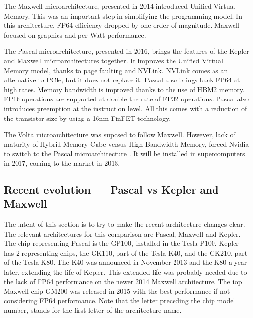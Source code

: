 The Maxwell microarchitecture, presented in 2014 introduced Unified Virtual Memory.
This was an important step in simplifying the programming model.
In this architecture, FP64 efficiency dropped by one order of magnitude.
Maxwell focused on graphics and per Watt performance.

The Pascal microarchitecture, presented in 2016, brings the features of the Kepler and Maxwell microarchitectures together.
It improves the Unified Virtual Memory model, thanks to page faulting and NVLink.
NVLink comes as an alternative to PCIe, but it does not replace it.
Pascal also brings back FP64 at high rates.
Memory bandwidth is improved thanks to the use of HBM2 memory.
FP16 operations are supported at double the rate of FP32 operations.
Pascal also introduces preemption at the instruction level.
All this comes with a reduction of the transistor size by using a 16nm FinFET technology.

The Volta microarchitecture was suposed to follow Maxwell.
However, lack of maturity of Hybrid Memory Cube versus High Bandwidth Memory, forced Nvidia to switch to the Pascal microarchitecture \cite{wccftech:volta}.
It will be installed in supercomputers in 2017, coming to the market in 2018.

\subsection{Recent evolution --- Pascal vs Kepler and Maxwell}
The intent of this section is to try to make the recent architecture changes clear.
The relevant architectures for this comparison are Pascal, Maxwell and Kepler.
The chip representing Pascal is the GP100, installed in the Tesla P100.
Kepler has 2 representing chips, the GK110, part of the Tesla K40, and the GK210, part of the Tesla K80.
The K40 was announced in November 2013 and the K80 a year later, extending the life of Kepler.
This extended life was probably needed due to the lack of FP64 performance on the newer 2014 Maxwell architecture.
The top Maxwell chip GM200 was released in 2015 with the best performance if not considering FP64 performance.
Note that the letter preceding the chip model number, stands for the first letter of the architecture name.

